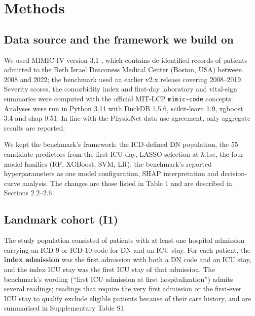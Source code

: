 \hypertarget{methods}{%
\section{Methods}\label{methods}}

\hypertarget{data-source-and-the-framework-we-build-on}{%
\subsection{Data source and the framework we build
on}\label{data-source-and-the-framework-we-build-on}}

We used MIMIC-IV version 3.1 \parencite{johnson2023}, which contains
de-identified records of patients admitted to the Beth Israel Deaconess Medical
Center (Boston, USA) between 2008 and 2022; the benchmark used an earlier v2.x
release covering 2008--2019. Severity scores, the comorbidity index and
first-day laboratory and vital-sign summaries were computed with the official
MIT-LCP \texttt{mimic-code} concepts. Analyses were run in Python 3.11 with
DuckDB 1.5.6, scikit-learn 1.9, xgboost 3.4 and shap 0.51. In line with the
PhysioNet data use agreement, only aggregate results are reported.

We kept the benchmark's framework: the ICD-defined DN population, the 55
candidate predictors from the first ICU day, LASSO selection at λ.1se, the four
model families (RF, XGBoost, SVM, LR), the benchmark's reported hyperparameters
as one model configuration, SHAP interpretation and decision-curve analysis. The
changes are those listed in Table 1 and are described in Sections 2.2--2.6.

\hypertarget{landmark-cohort-i1}{%
\subsection{Landmark cohort (I1)}\label{landmark-cohort-i1}}

The study population consisted of patients with at least one hospital admission
carrying an ICD-9 or ICD-10 code for DN and an ICU stay. For each patient, the
\textbf{index admission} was the first admission with both a DN code and an ICU
stay, and the index ICU stay was the first ICU stay of that admission. The
benchmark's wording (``first ICU admission at first hospitalization'') admits
several readings; readings that require the very first admission or the
first-ever ICU stay to qualify exclude eligible patients because of their care
history, and are summarised in Supplementary Table S1.

